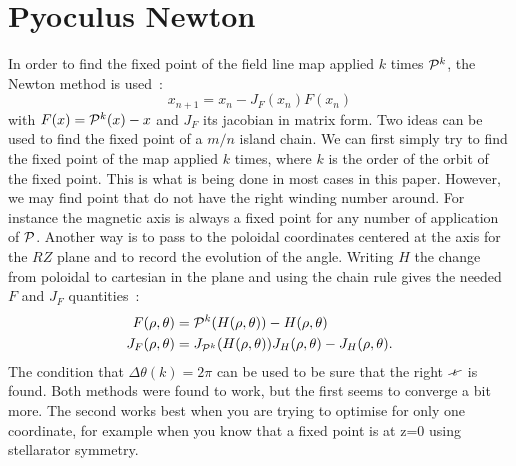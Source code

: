 \section{Pyoculus Newton}\label{sec:newton}

In order to find the fixed point of the field line map applied $k$ times $\mathcal{P}^k$, the Newton method is used~:
\begin{equation*}
    x_{n+1} = x_n - J_F(x_n)F(x_n)    
\end{equation*}
with $F(x) = \mathcal{P}^k(x) - x$ and $J_F$ its jacobian in matrix form. Two ideas can be used to find the fixed point of a $m/n$ island chain. We can first simply try to find the fixed point of the map applied $k$ times, where $k$ is the order of the orbit of the fixed point. This is what is being done in most cases in this paper. However, we may find point that do not have the right winding number around. For instance the magnetic axis is always a fixed point for any number of application of $\mathcal{P}$. Another way is to pass to the poloidal coordinates centered at the axis for the $RZ$ plane and to record the evolution of the angle. Writing $H$ the change from poloidal to cartesian in the plane and using the chain rule gives the needed $F$ and $J_F$ quantities~:
\begin{align*}
    F(\rho,\theta) &= \mathcal{P}^k(H(\rho,\theta)) - H(\rho,\theta)\\
    J_F(\rho,\theta) &= J_{\mathcal{P}^k}(H(\rho,\theta))J_H(\rho,\theta) - J_H(\rho,\theta).
\end{align*}
The condition that $\Delta\theta(k) = 2\pi$ can be used to be sure that the right $\iotaslash$ is found. Both methods were found to work, but the first seems to converge a bit more. The second works best when you are trying to optimise for only one coordinate, for example when you know that a fixed point is at z=0 using stellarator symmetry.
